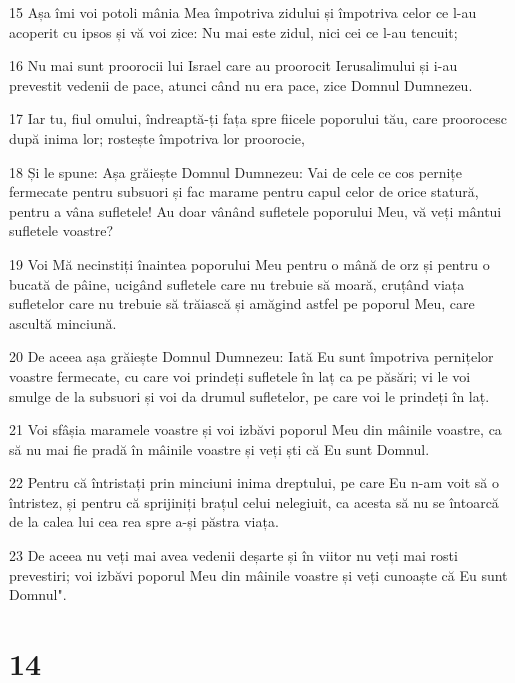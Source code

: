 \par 15 Așa îmi voi potoli mânia Mea împotriva zidului și împotriva celor ce l-au acoperit cu ipsos și vă voi zice: Nu mai este zidul, nici cei ce l-au tencuit;
\par 16 Nu mai sunt proorocii lui Israel care au proorocit Ierusalimului și i-au prevestit vedenii de pace, atunci când nu era pace, zice Domnul Dumnezeu.
\par 17 Iar tu, fiul omului, îndreaptă-ți fața spre fiicele poporului tău, care proorocesc după inima lor; rostește împotriva lor proorocie,
\par 18 Și le spune: Așa grăiește Domnul Dumnezeu: Vai de cele ce cos pernițe fermecate pentru subsuori și fac marame pentru capul celor de orice statură, pentru a vâna sufletele! Au doar vânând sufletele poporului Meu, vă veți mântui sufletele voastre?
\par 19 Voi Mă necinstiți înaintea poporului Meu pentru o mână de orz și pentru o bucată de pâine, ucigând sufletele care nu trebuie să moară, cruțând viața sufletelor care nu trebuie să trăiască și amăgind astfel pe poporul Meu, care ascultă minciună.
\par 20 De aceea așa grăiește Domnul Dumnezeu: Iată Eu sunt împotriva pernițelor voastre fermecate, cu care voi prindeți sufletele în laț ca pe păsări; vi le voi smulge de la subsuori și voi da drumul sufletelor, pe care voi le prindeți în laț.
\par 21 Voi sfâșia maramele voastre și voi izbăvi poporul Meu din mâinile voastre, ca să nu mai fie pradă în mâinile voastre și veți ști că Eu sunt Domnul.
\par 22 Pentru că întristați prin minciuni inima dreptului, pe care Eu n-am voit să o întristez, și pentru că sprijiniți brațul celui nelegiuit, ca acesta să nu se întoarcă de la calea lui cea rea spre a-și păstra viața.
\par 23 De aceea nu veți mai avea vedenii deșarte și în viitor nu veți mai rosti prevestiri; voi izbăvi poporul Meu din mâinile voastre și veți cunoaște că Eu sunt Domnul".

\chapter{14}


